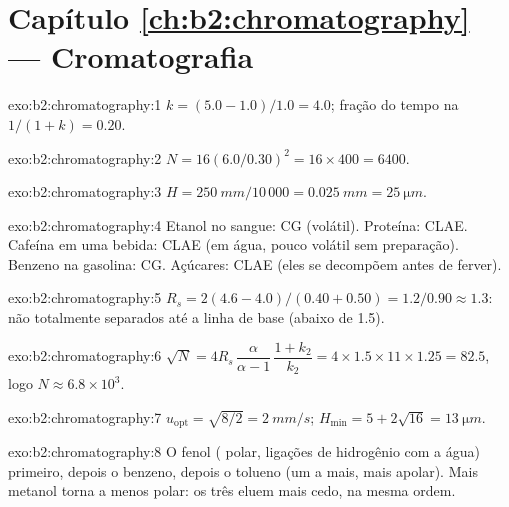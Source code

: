 \section*{Capítulo \ref{ch:b2:chromatography} --- Cromatografia}

\begin{solution}{exo:b2:chromatography:1}
$k = (5.0 - 1.0)/1.0 = 4.0$; fração do tempo na  $1/(1 + k) = 0.20$.
\end{solution}

\begin{solution}{exo:b2:chromatography:2}
$N = 16(6.0/0.30)^2 = 16 \times 400 = 6400$.
\end{solution}

\begin{solution}{exo:b2:chromatography:3}
$H = \qty{250}{mm}/10\,000 = \qty{0.025}{mm} = \qty{25}{\micro m}$.
\end{solution}

\begin{solution}{exo:b2:chromatography:4}
Etanol no sangue: CG (volátil). Proteína: CLAE. Cafeína em uma bebida: CLAE (em água, pouco volátil
sem preparação). Benzeno na gasolina: CG. Açúcares: CLAE (eles se decompõem antes de ferver).
\end{solution}

\begin{solution}{exo:b2:chromatography:5}
$R_s = 2(4.6 - 4.0)/(0.40 + 0.50) = 1.2/0.90 \approx 1.3$: não totalmente separados até a linha de base (abaixo de 1.5).
\end{solution}

\begin{solution}{exo:b2:chromatography:6}
$\sqrt N = 4R_s\,\dfrac{\alpha}{\alpha - 1}\,\dfrac{1 + k_2}{k_2} = 4 \times 1.5 \times 11 \times 1.25 =
82.5$, logo $N \approx 6.8 \times 10^3$.
\end{solution}

\begin{solution}{exo:b2:chromatography:7}
$u_{\mathrm{opt}} = \sqrt{8/2} = \qty{2}{mm/s}$; $H_{\min} = 5 + 2\sqrt{16} = \qty{13}{\micro m}$.
\end{solution}

\begin{solution}{exo:b2:chromatography:8}
O fenol ( polar, ligações de hidrogênio com a água) primeiro, depois o benzeno, depois o tolueno
(um  a mais, mais apolar). Mais metanol torna a  menos polar: os três eluem mais cedo,
na mesma ordem.
\end{solution}

